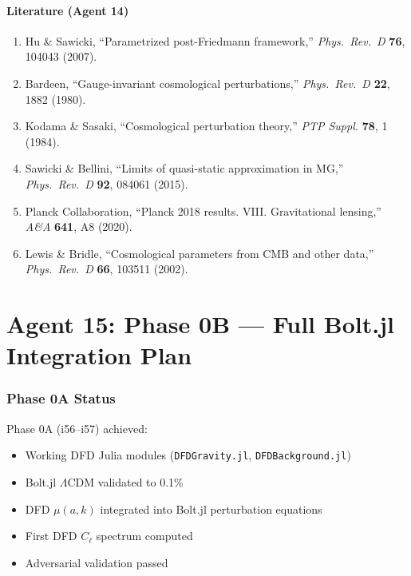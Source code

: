 \documentclass[11pt,a4paper]{article}
\begin{document}
\subsection{Literature (Agent 14)}

\begin{enumerate}
\item Hu \& Sawicki, ``Parametrized post-Friedmann framework,'' \textit{Phys.\ Rev.\ D} \textbf{76}, 104043 (2007).
\item Bardeen, ``Gauge-invariant cosmological perturbations,'' \textit{Phys.\ Rev.\ D} \textbf{22}, 1882 (1980).
\item Kodama \& Sasaki, ``Cosmological perturbation theory,'' \textit{PTP Suppl.} \textbf{78}, 1 (1984).
\item Sawicki \& Bellini, ``Limits of quasi-static approximation in MG,'' \textit{Phys.\ Rev.\ D} \textbf{92}, 084061 (2015).
\item Planck Collaboration, ``Planck 2018 results. VIII. Gravitational lensing,'' \textit{A\&A} \textbf{641}, A8 (2020).
\item Lewis \& Bridle, ``Cosmological parameters from CMB and other data,'' \textit{Phys.\ Rev.\ D} \textbf{66}, 103511 (2002).
\end{enumerate}


\part{Agent 15: Phase 0B --- Full Bolt.jl Integration Plan}
\label{part:phase0b}

\section{Phase 0A Status}

Phase 0A (i56--i57) achieved:
\begin{itemize}
\item Working DFD Julia modules (\texttt{DFDGravity.jl}, \texttt{DFDBackground.jl})
\item Bolt.jl $\Lambda$CDM validated to 0.1\%
\item DFD $\mu(a,k)$ integrated into Bolt.jl perturbation equations
\item First DFD $C_\ell$ spectrum computed
\item Adversarial validation passed
\end{itemize}
\end{document}
